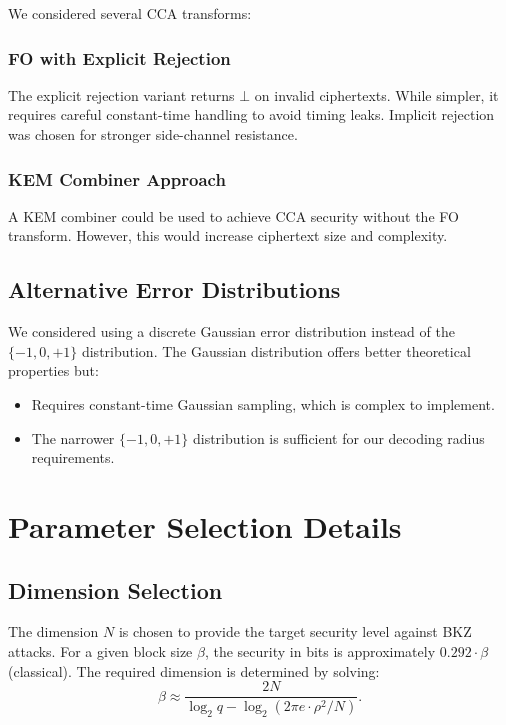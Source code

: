 \documentclass[11pt,a4paper]{article}
\newcommand{\FO}{\textsf{FO}\xspace}
\begin{document}
We considered several CCA transforms:

\subsubsection{FO with Explicit Rejection}

The explicit rejection variant returns $\bot$ on invalid ciphertexts. While simpler, it requires careful constant-time handling to avoid timing leaks. Implicit rejection was chosen for stronger side-channel resistance.

\subsubsection{KEM Combiner Approach}

A KEM combiner could be used to achieve CCA security without the \FO transform. However, this would increase ciphertext size and complexity.

\subsection{Alternative Error Distributions}

We considered using a discrete Gaussian error distribution instead of the $\{-1, 0, +1\}$ distribution. The Gaussian distribution offers better theoretical properties but:
\begin{itemize}[leftmargin=2em]
\item Requires constant-time Gaussian sampling, which is complex to implement.
\item The narrower $\{-1, 0, +1\}$ distribution is sufficient for our decoding radius requirements.
\end{itemize}

\section{Parameter Selection Details}\label{app:parameters}

\subsection{Dimension Selection}

The dimension $N$ is chosen to provide the target security level against BKZ attacks. For a given block size $\beta$, the security in bits is approximately $0.292 \cdot \beta$ (classical). The required dimension is determined by solving:
\[
\beta \approx \frac{2N}{\log_2 q - \log_2(2\pi e \cdot \rho^2 / N)}.
\]
\end{document}
